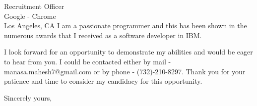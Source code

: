 \documentclass[11pt]{letter} %
\begin{document}
\begin{letter}{
Recruitment Officer \\
Google - Chrome\\
Los Angeles, CA }
 I am a passionate programmer and this has been shown in the
 numerous awards that I received as a software developer in IBM. 
 
 I look forward for an opportunity to demonstrate my abilities and would be
 eager to hear from you. I could be contacted either by mail -
 manasa.mahesh7@gmail.com or by phone - (732)-210-8297. Thank you for your patience and time to consider my
 candidacy for this opportunity.

 

\closing{Sincerely yours,}



\end{letter}
\end{document}
